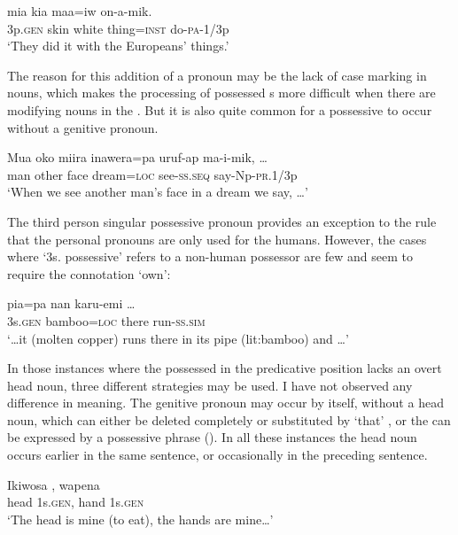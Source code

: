 \ea%
\label{ex:3:x574}
\gll {} mia kia maa=iw on-a-mik. \\
3p.\textsc{gen} skin white thing=\textsc{inst} do-\textsc{pa}-1/3p\\
\glt`They did it with the Europeans' things.'
\z

The reason for this addition of a pronoun may be the lack of case marking in nouns, which makes the processing of possessed s more difficult when there are modifying nouns in the . But it is also quite common for a possessive  to occur without a genitive pronoun. 

\ea%
\label{ex:3:x575}
\gll Mua oko miira inawera=pa uruf-ap ma-i-mik, {\dots} \\
man other face dream=\textsc{loc} see-\textsc{ss}.\textsc{seq} say-Np-\textsc{pr}.1/3p\\
\glt`When we see another man's face in a dream we say, {\dots}'
\z

The third person singular possessive pronoun provides an exception to the rule that the personal pronouns are only used for the humans. However, the cases where  `3s. possessive' refers to a non-human possessor are few and seem to require the connotation `own':

\ea%
\label{ex:3:x1808}
\gll {\dots} pia=pa nan karu-emi {\dots} \\
3s.\textsc{gen} bamboo=\textsc{loc} there run-\textsc{ss}.\textsc{sim} \\
\glt`{\dots}it (molten copper) runs there in its pipe (lit:bamboo) and {\dots}'
\z

In those instances where the possessed  in the predicative position lacks an overt head noun, three different strategies may be used. I have not observed any difference in meaning. The genitive pronoun may occur by itself, without a head noun, which can either be deleted completely  or substituted by  `that' , or the  can be expressed by a possessive phrase  (). In all these instances the head noun occurs earlier in the same sentence, or occasionally in the preceding sentence. 

\ea%
\label{ex:3:x576}
\gll Ikiwosa , wapena  \\
head 1s.\textsc{gen}, hand 1s.\textsc{gen}\\
\glt`The head is mine (to eat), the hands are mine{\dots}'
\z

